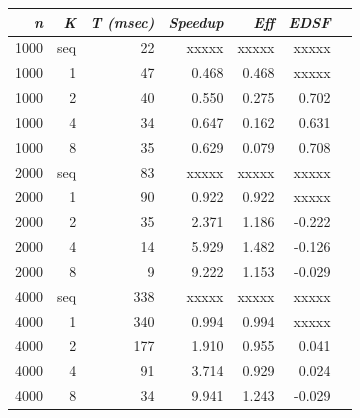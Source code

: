 \documentclass{dependencies/acm_proc_article-sp}
\begin{document}
\begin{center}
\begin{tabular}{|r|r|r|r|r|r|r|}\hline
{\em n} & {\em K} & {\em T (msec)} & {\em Speedup} & {\em Eff} & {\em EDSF} \\\hline
1000    & seq     &  22        & xxxxx       & xxxxx   & xxxxx     \\\hline
1000    & 1       &  47        & 0.468       & 0.468   & xxxxx     \\\hline
1000    & 2       &  40        & 0.550       & 0.275   & 0.702     \\\hline
1000    & 4       &  34        & 0.647       & 0.162   & 0.631     \\\hline
1000    & 8       &  35        & 0.629       & 0.079   & 0.708     \\\hline
2000    & seq     &  83        & xxxxx       & xxxxx   & xxxxx     \\\hline
2000    & 1       &  90        & 0.922       & 0.922   & xxxxx    \\\hline
2000    & 2       &  35        & 2.371       & 1.186   & -0.222    \\\hline
2000    & 4       &  14        & 5.929       & 1.482   & -0.126    \\\hline
2000    & 8       &   9        & 9.222       & 1.153   & -0.029    \\\hline
4000    & seq     &  338       & xxxxx       & xxxxx   & xxxxx     \\\hline
4000    & 1       &  340       & 0.994       & 0.994   & xxxxx     \\\hline
4000    & 2       &  177       & 1.910       & 0.955   & 0.041     \\\hline
4000    & 4       &  91        & 3.714       & 0.929   & 0.024     \\\hline
4000    & 8       &  34        & 9.941       & 1.243   & -0.029    \\\hline
\end{tabular}
\end{center}
\end{document}

